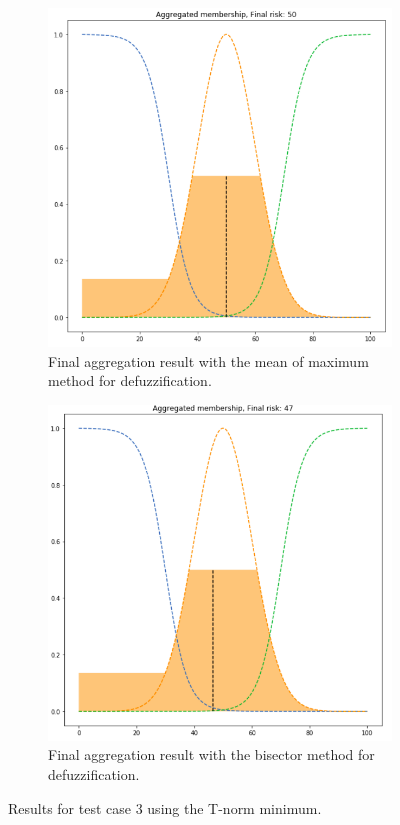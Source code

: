 \begin{figure}[ht]
\begin{subfigure}{.5\textwidth}
  \centering
  \includegraphics[width=.8\linewidth]{figures/third/min-mom.png}  
  \caption{Final aggregation result with the mean of maximum method for defuzzification.}
  \label{fig:3min-mom}
\end{subfigure}
\begin{subfigure}{.5\textwidth}
  \centering
  \includegraphics[width=.8\linewidth]{figures/third/min-bisector.png}  
  \caption{Final aggregation result with the bisector method for defuzzification.}
  \label{fig:3min-bisector}
\end{subfigure}
\caption{Results for test case 3 using the T-norm minimum.}
\label{fig:testcase3min}
\end{figure}

